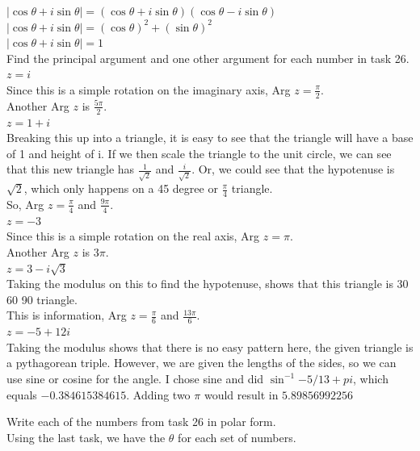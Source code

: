 \documentclass[12pt]{article}
\begin{document}
$|\cos\theta + i\sin\theta| = (\cos\theta + i\sin\theta)(\cos\theta - i\sin\theta)$\\
$|\cos\theta + i\sin\theta| = (\cos\theta)^2 + (\sin\theta)^2$\\
$|\cos\theta + i\sin\theta| = 1$\\


 Find the principal argument and one other argument for each number in task 26.\\

 $z = i$\\
Since this is a simple rotation on the imaginary axis, Arg $z = \frac{\pi}{2}$.\\ 
Another Arg $z$ is $\frac{5\pi}{2}$.\\

 $z = 1 + i$\\
Breaking this up into a triangle, it is easy to see that the triangle will have a base of 1 and height of i. 
If we then scale the triangle to the unit circle, we can see that this new triangle has $\frac{1}{\sqrt{2}}$ and $\frac{i}{\sqrt{2}}$.
Or, we could see that the hypotenuse is $\sqrt{2}$, which only happens on a 45 degree or $\frac{\pi}{4}$ triangle.\\

So, Arg $z = \frac{\pi}{4}$ and $\frac{9\pi}{4}$.\\

 $z = -3$\\
Since this is a simple rotation on the real axis, Arg $z = \pi$.\\
Another Arg $z$ is $3\pi$.\\

 $z = 3 - i\sqrt{3}$\\
Taking the modulus on this to find the hypotenuse, shows that this triangle is 30 60 90 triangle.\\
This is information, Arg $z = \frac{\pi}{6}$ and $\frac{13\pi}{6}$.\\


 $z = -5 + 12i$\\
Taking the modulus shows that there is no easy pattern here, the given triangle is a pythagorean triple.
However, we are given the lengths of the sides, so we can use sine or cosine for the angle. 
I chose sine and did $\sin^{-1}{-5/13} + pi$, which equals $-0.384615384615$.
Adding two $\pi$ would result in $5.89856992256$


 Write each of the numbers from task 26 in polar form.\\
Using the last task, we have the $\theta$ for each set of numbers.\\
\end{document}
